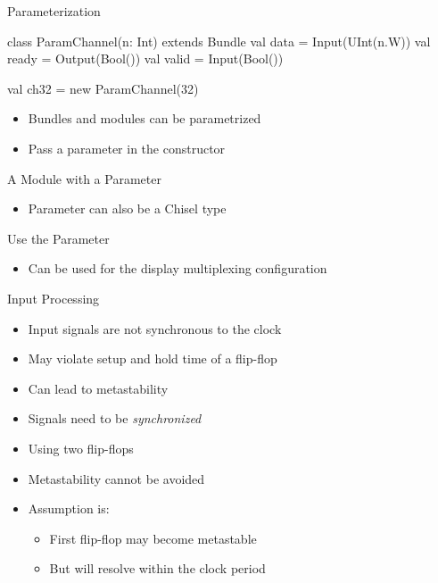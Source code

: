 \begin{frame}[fragile]{Parameterization}
\begin{chisel}
class ParamChannel(n: Int) extends Bundle {
  val data = Input(UInt(n.W))
  val ready = Output(Bool())
  val valid = Input(Bool())
}

val ch32 = new ParamChannel(32)
\end{chisel}
\begin{itemize}
\item Bundles and modules can be parametrized
\item Pass a parameter in the constructor
\end{itemize}

\end{frame}
\begin{frame}[fragile]{A Module with a Parameter}
\begin{itemize}
\item Parameter can also be a Chisel type
\end{itemize}
\end{frame}

\begin{frame}[fragile]{Use the Parameter}
\begin{itemize}
\item Can be used for the display multiplexing configuration
\end{itemize}
\end{frame}


\begin{frame}[fragile]{Input Processing}
\begin{itemize}
\item Input signals are not synchronous to the clock
\item May violate setup and hold time of a flip-flop
\item Can lead to metastability
\item Signals need to be \emph{synchronized}
\item Using two flip-flops
\item Metastability cannot be avoided
\item Assumption is:
\begin{itemize}
\item First flip-flop may become metastable
\item But will resolve within the clock period
\end{itemize}
\end{itemize}
\end{frame}

